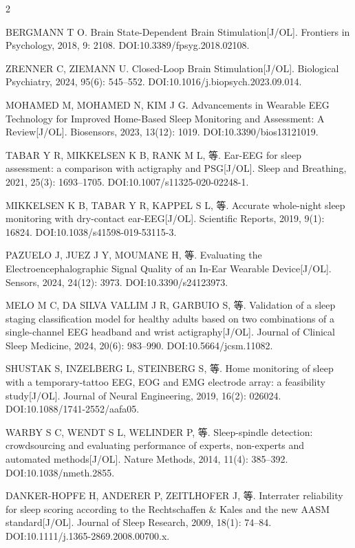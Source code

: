 \documentclass[UTF8,zihao=5,fontset=none]{ctexart}
\begin{document}
\begin{multicols}{2}
{\makebox[25.2pt][l]{[18]}BERGMANN T O. Brain State-Dependent Brain Stimulation[J/OL]. Frontiers in Psychology, 2018, 9: 2108. DOI:10.3389/fpsyg.2018.02108.\par
\makebox[25.2pt][l]{[19]}ZRENNER C, ZIEMANN U. Closed-Loop Brain Stimulation[J/OL]. Biological Psychiatry, 2024, 95(6): 545--552. DOI:10.1016/j.biopsych.2023.09.014.\par
\makebox[25.2pt][l]{[20]}MOHAMED M, MOHAMED N, KIM J G. Advancements in Wearable EEG Technology for Improved Home-Based Sleep Monitoring and Assessment: A Review[J/OL]. Biosensors, 2023, 13(12): 1019. DOI:10.3390/bios13121019.\par
\makebox[25.2pt][l]{[21]}TABAR Y R, MIKKELSEN K B, RANK M L, 等. Ear-EEG for sleep assessment: a comparison with actigraphy and PSG[J/OL]. Sleep and Breathing, 2021, 25(3): 1693--1705. DOI:10.1007/s11325-020-02248-1.\par
\makebox[25.2pt][l]{[22]}MIKKELSEN K B, TABAR Y R, KAPPEL S L, 等. Accurate whole-night sleep monitoring with dry-contact ear-EEG[J/OL]. Scientific Reports, 2019, 9(1): 16824. DOI:10.1038/s41598-019-53115-3.\par
\makebox[25.2pt][l]{[23]}PAZUELO J, JUEZ J Y, MOUMANE H, 等. Evaluating the Electroencephalographic Signal Quality of an In-Ear Wearable Device[J/OL]. Sensors, 2024, 24(12): 3973. DOI:10.3390/s24123973.\par
\makebox[25.2pt][l]{[24]}MELO M C, DA SILVA VALLIM J R, GARBUIO S, 等. Validation of a sleep staging classification model for healthy adults based on two combinations of a single-channel EEG headband and wrist actigraphy[J/OL]. Journal of Clinical Sleep Medicine, 2024, 20(6): 983--990. DOI:10.5664/jcsm.11082.\par
\makebox[25.2pt][l]{[25]}SHUSTAK S, INZELBERG L, STEINBERG S, 等. Home monitoring of sleep with a temporary-tattoo EEG, EOG and EMG electrode array: a feasibility study[J/OL]. Journal of Neural Engineering, 2019, 16(2): 026024. DOI:10.1088/1741-2552/aafa05.\par
\makebox[25.2pt][l]{[26]}WARBY S C, WENDT S L, WELINDER P, 等. Sleep-spindle detection: crowdsourcing and evaluating performance of experts, non-experts and automated methods[J/OL]. Nature Methods, 2014, 11(4): 385--392. DOI:10.1038/nmeth.2855.\par
\makebox[25.2pt][l]{[27]}DANKER-HOPFE H, ANDERER P, ZEITLHOFER J, 等. Interrater reliability for sleep scoring according to the Rechtschaffen \& Kales and the new AASM standard[J/OL]. Journal of Sleep Research, 2009, 18(1): 74--84. DOI:10.1111/j.1365-2869.2008.00700.x.\par
}
\end{multicols}
\end{document}
